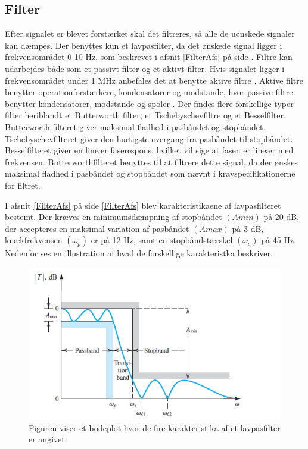 \subsection{Filter}
Efter signalet er blevet forstærket skal det filtreres, så alle de uønskede signaler kan dæmpes. Der benyttes kun et lavpasfilter, da det ønskede signal ligger i frekvensområdet 0-10 Hz, som beskrevet i afsnit \ref{FilterAfs} på side \pageref{FilterAfs}. Filtre kan udarbejdes både som et passivt filter og et aktivt filter. Hvis signalet ligger i frekvensområdet under 1 MHz anbefales det at benytte aktive filtre \cite{Op amps for everyone}. Aktive filtre benytter operationforstærkere, kondensatorer og modstande, hvor passive filtre benytter kondensatorer, modstande og spoler \cite{Op amps for everyone}. Der findes flere forskellige typer filter heriblandt et Butterworth filter, et Tschebyschevfiltre og et Besselfilter. Butterworth filteret giver maksimal fladhed i pasbåndet og stopbåndet. Tschebyschevfilteret giver den hurtigste overgang fra pasbåndet til stopbåndet. Besselfilteret giver en lineær faserespons, hvilket vil sige at fasen er lineær med frekvensen. \cite{Op amps for everyone} Butterworthfilteret benyttes til at filtrere dette signal, da der ønskes maksimal fladhed i pasbåndet og stopbåndet som nævnt i kravspecifikationerne for filtret.

I afsnit \ref{FilterAfs} på side \ref{FilterAfs} blev karakteristikaene af lavpasfilteret bestemt. Der kræves en minimumsdæmpning af stopbåndet $(Amin)$ på 20 dB, der accepteres en maksimal variation af pasbåndet $(Amax)$ på 3 dB, knækfrekvensen $(\omega _p)$ er på 12 Hz, samt en stopbåndstærskel $( \omega _s)$ på 45 Hz. Nedenfor ses en illustration af hvad de forskellige karakteristka beskriver.

\begin{figure}[H]
\centering
\includegraphics[scale=1]{figures/cProblemloesning/Lavpasfilter_generisk.PNG}
\caption{Figuren viser et bodeplot hvor de fire karakteristika af et lavpasfilter er angivet.}
\label{fig:lavpasfilter_generisk}
\end{figure} 

